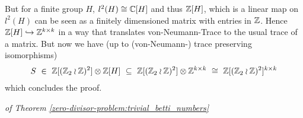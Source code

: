 	But for a finite group $H$, $l^2(H) \cong \mathbb{C}[H]$ and thus $\mathbb{Z}[H]$, which is a linear map on $l^2(H)$ can be seen as a finitely dimensioned matrix with entries in $\mathbb{Z}$.
	Hence $\mathbb{Z}[H] \hookrightarrow \mathbb{Z}^{k \times k}$ in a way that translates von-Neumann-Trace to the usual trace of a matrix.
	But now we have (up to (von-Neumann-) trace preserving isomorphisms)
	\begin{align*}
		S ~\in~ \mathbb{Z}[(\mathbb{Z}_2 \wr \mathbb{Z})^2] \otimes \mathbb{Z}[H] ~\subseteq~ \mathbb{Z}[(\mathbb{Z}_2 \wr \mathbb{Z})^2] \otimes \mathbb{Z}^{k \times k} ~\cong~ \mathbb{Z}[(\mathbb{Z}_2 \wr \mathbb{Z})^2]^{k \times k}
	\end{align*}
	which concludes the proof.
\endproof


\proof \emph{of Theorem \ref{zero-divisor-problem:trivial_betti_numbers}}
\endproof

